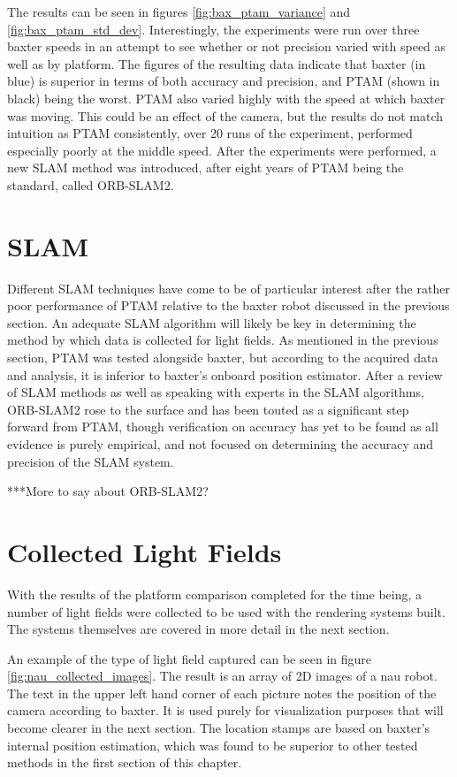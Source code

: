 \documentclass[12pt]{report}
\begin{document}
The results can be seen in figures \ref{fig:bax_ptam_variance} and \ref{fig:bax_ptam_std_dev}. Interestingly, the experiments were run over three baxter speeds in an attempt to see whether or not precision varied with speed as well as by platform. The figures of the resulting data indicate that baxter (in blue) is superior in terms of both accuracy and precision, and PTAM (shown in black) being the worst. PTAM also varied highly with the speed at which baxter was moving. This could be an effect of the camera, but the results do not match intuition as PTAM consistently, over 20 runs of the experiment, performed especially poorly at the middle speed. After the experiments were performed, a new SLAM method was introduced, after eight years of PTAM being the standard, called ORB-SLAM2.

\section{SLAM}
Different SLAM techniques have come to be of particular interest after the rather poor performance of PTAM relative to the baxter robot discussed in the previous section. An adequate SLAM algorithm will likely be key in determining the method by which data is collected for light fields. As mentioned in the previous section, PTAM was tested alongside baxter, but according to the acquired data and analysis, it is inferior to baxter's onboard position estimator. After a review of SLAM methods as well as speaking with experts in the SLAM algorithms, ORB-SLAM2 rose to the surface and has been touted as a significant step forward from PTAM, though verification on accuracy has yet to be found as all evidence is purely empirical, and not focused on determining the accuracy and precision of the SLAM system.

***More to say about ORB-SLAM2?

\section{Collected Light Fields}

With the results of the platform comparison completed for the time being, a number of light fields were collected to be used with the rendering systems built. The systems themselves are covered in more detail in the next section. 

An example of the type of light field captured can be seen in figure \ref{fig:nau_collected_images}. The result is an array of 2D images of a nau robot. The text in the upper left hand corner of each picture notes the position of the camera according to baxter. It is used purely for visualization purposes that will become clearer in the next section. The location stamps are based on baxter's internal position estimation, which was found to be superior to other tested methods in the first section of this chapter.
\end{document}
